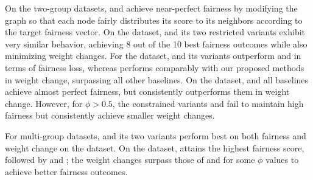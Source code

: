 \documentclass[sigconf, anonymous, review]{acmart}
\begin{document}
On the two-group datasets, \lfpru and \lfprn achieve near-perfect fairness by modifying the graph so that each node fairly distributes its \pagerank score to its neighbors according to the target fairness vector. On the \blogs dataset, \fairgd and its two restricted variants exhibit very similar behavior, achieving 8 out of the 10 best fairness outcomes while also minimizing weight changes. For the \twitter dataset, \fairgd and its variants outperform \fairwalk and \crosswalk in terms of fairness loss, whereas \fairwalk performs comparably with our proposed methods in weight change, surpassing all other baselines. On the \mind dataset, \fairgd and all baselines achieve almost perfect fairness, but \fairgd consistently outperforms them in weight change. However, for \(\phi > 0.5\), the constrained variants \fairgdrone and \fairgdrtwo fail to maintain high fairness but consistently achieve smaller weight changes.

For multi-group datasets, \fairgd and its two variants perform best on both fairness and weight change on the \slashdot dataset. On the \book dataset, \fairgd attains the highest fairness score, followed by \fairgdrtwo and \fairgdrone; the weight changes surpass those of \fairwalk and \crosswalk for some $\phi$ values to achieve better fairness outcomes.






\end{document}
